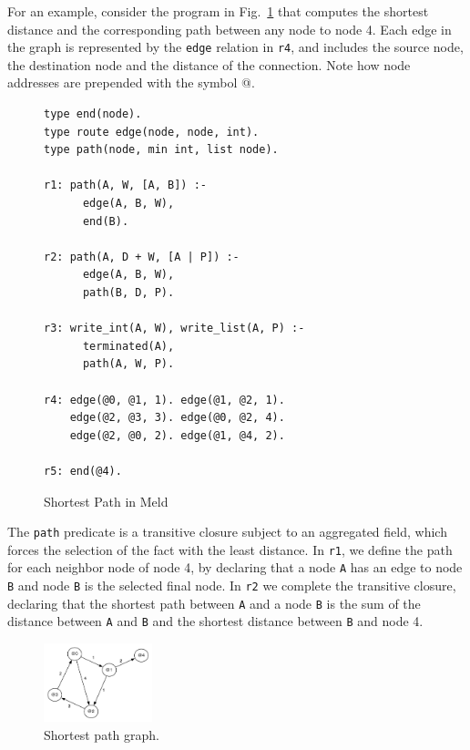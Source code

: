 \documentclass[preprint]{sigplanconf}
\begin{document}
For an example, consider the program in Fig.~\ref{fig:shortestpath} that computes the
shortest distance and the corresponding path between any node to node 4.
Each edge in the graph is represented
by the \texttt{edge} relation in \texttt{r4}, and includes the source node, the destination node and
the distance of the connection. Note how node addresses are prepended with the symbol @.

\begin{figure}
\begin{verbatim}
type end(node).
type route edge(node, node, int).
type path(node, min int, list node).

r1: path(A, W, [A, B]) :-
      edge(A, B, W),
      end(B).

r2: path(A, D + W, [A | P]) :-
      edge(A, B, W),
      path(B, D, P).
  
r3: write_int(A, W), write_list(A, P) :-
      terminated(A),
      path(A, W, P).
  
r4: edge(@0, @1, 1). edge(@1, @2, 1).
    edge(@2, @3, 3). edge(@0, @2, 4).
    edge(@2, @0, 2). edge(@1, @4, 2).

r5: end(@4).
\end{verbatim}
\caption{Shortest Path in Meld}
\label{fig:shortestpath}
\end{figure}

The \texttt{path} predicate is a transitive closure
subject to an aggregated field, which forces the selection
of the fact with the least distance. In \texttt{r1}, we define the path
for each neighbor node of node 4, by declaring that a node \texttt{A} has an edge to node \texttt{B}
and node \texttt{B} is the selected final node.
In \texttt{r2} we complete the transitive closure, declaring that the shortest path between \texttt{A}
and a node \texttt{B} is the sum of the distance between \texttt{A} and \texttt{B} and the
shortest distance between \texttt{B} and node 4.

\begin{figure}[ht]
  \centering
    \includegraphics[width=0.28\textwidth]{figures/shortestpathgraph.pdf}
  \caption{Shortest path graph.}
  \label{fig:shortestpathfig}
\end{figure}
\end{document}
